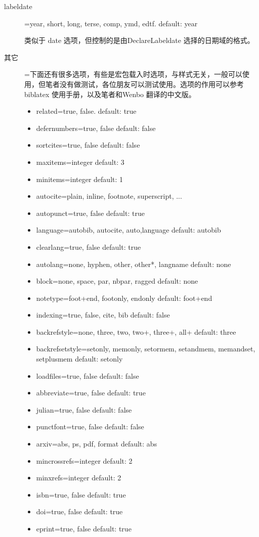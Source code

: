 \begin{description}
  \item[labeldate]=year, short, long, terse, comp, ymd, edtf. \hfill default: year

  类似于 date 选项，但控制的是由DeclareLabeldate 选择的日期域的格式。

  \item[其它]=下面还有很多选项，有些是宏包载入时选项，与样式无关，一般可以使用，但笔者没有做测试，各位朋友可以测试使用。选项的作用可以参考biblatex 使用手册，以及笔者和Wenbo 翻译的中文版。
      \begin{itemize}
          \item related=true, false. default: true
          \item defernumbers=true, false default: false
          \item sortcites=true, false default: false
          \item maxitems=integer default: 3
          \item minitems=integer default: 1
          \item autocite=plain, inline, footnote, superscript, ...
          \item autopunct=true, false default: true
          \item language=autobib, autocite, auto,language default: autobib
          \item clearlang=true, false default: true
          \item autolang=none, hyphen, other, other*, langname default: none
          \item block=none, space, par, nbpar, ragged default: none
          \item notetype=foot+end, footonly, endonly default: foot+end
          \item indexing=true, false, cite, bib default: false
          \item backrefstyle=none, three, two, two+, three+, all+ default: three
          \item backrefsetstyle=setonly, memonly, setormem, setandmem, memandset, setplusmem default: setonly
          \item loadfiles=true, false default: false
          \item abbreviate=true, false default: true
          \item julian=true, false default: false
          \item punctfont=true, false default: false
          \item arxiv=abs, ps, pdf, format default: abs
          \item mincrossrefs=integer default: 2
          \item minxrefs=integer default: 2
          \item isbn=true, false default: true
          \item doi=true, false default: true
          \item eprint=true, false default: true
      \end{itemize}

\end{description}


